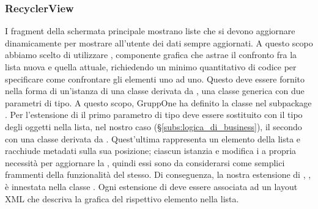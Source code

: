 \documentclass[../../manuale-manutentore.tex]{subfiles}
\begin{document}

\subsubsection{RecyclerView}%
\label{subs:recyclerview}

I fragment della schermata principale mostrano liste che si devono aggiornare dinamicamente per mostrare all'utente dei dati sempre aggiornati.
A questo scopo abbiamo scelto di utilizzare , componente grafica che astrae il confronto fra la lista nuova e quella attuale, richiedendo un minimo quantitativo di codice per specificare come confrontare gli elementi uno ad uno.
Questo deve essere fornito nella forma di un'istanza di una classe derivata da , una classe generica con due parametri di tipo.
A questo scopo, GruppOne ha definito la classe  nel subpackage .
Per l'estensione di  il primo parametro di tipo deve essere sostituito con il tipo degli oggetti nella lista, nel nostro caso  (§\ref{subs:logica_di_business}), il secondo con una classe derivata da .
Quest'ultima rappresenta un elemento della lista e racchiude metadati sulla sua posizione; ciascun  istanzia e modifica i  a propria necessità per aggiornare la , quindi essi sono da considerarsi come semplici frammenti della funzionalità del  stesso.
Di conseguenza, la nostra estensione di , , è innestata nella classe . Ogni estensione di  deve essere associata ad un layout XML che descriva la grafica del rispettivo elemento nella lista.\par
\end{document}
